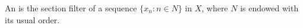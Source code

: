 An  is the section filter of a sequence $\{x_n: n \in N\}$ in $X$, where $N$ is endowed with its usual order.
